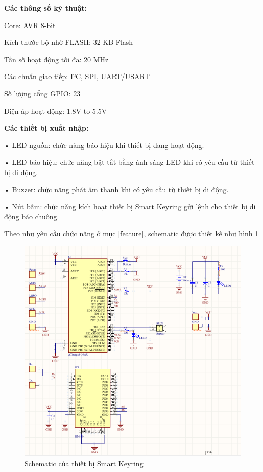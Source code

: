 \textbf{Các thông số kỹ thuật:}

Core:	 AVR 8-bit

Kích thước bộ nhớ FLASH:	 32 KB Flash

Tần số hoạt động tối đa:	 20 MHz

Các chuẩn giao tiếp:	 I²C, SPI, UART/USART

Số lượng cổng GPIO:	 23

Điện áp hoạt động:	 1.8V to 5.5V

\textbf{Các thiết bị xuất nhập:}

• LED nguồn: chức năng báo hiệu khi thiết bị đang hoạt động.

• LED báo hiệu: chức năng bật tắt bằng ánh sáng LED khi có yêu cầu từ thiết bị di động.

• Buzzer: chức năng phát âm thanh khi có yêu cầu từ thiết bị di động.

• Nút bấm: chức năng kích hoạt thiết bị Smart Keyring gửi lệnh cho thiết bị di động báo chuông.

Theo như yêu cầu chức năng ở mục \ref{feature}, schematic được thiết kế như hình \ref{fig: schematic}

	\begin{figure}[H]
		\centering    
		\includegraphics[width=1.0\textwidth]{schematic}
		\caption[Schematic của thiết bị Smart Keyring]{Schematic của thiết bị Smart Keyring}
		\label{fig: schematic}
	\end{figure}
	
